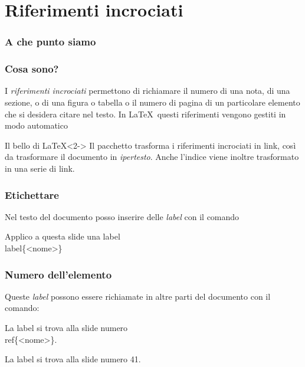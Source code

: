 \documentclass[svgnames,%
	ucs,%
	pdftex]{guitbeamer}
\begin{document}
\section{Riferimenti incrociati}
\begin{frame}
  \frametitle{A che punto siamo}
\end{frame}
\begin{frame}
  \frametitle{Cosa sono?}
	I \emph{riferimenti incrociati} permettono di richiamare il numero di
	una nota, di una sezione, o di una figura o tabella o il numero di
	pagina di un particolare elemento che si desidera citare nel testo.
  \bigskip
	In \LaTeX\ questi riferimenti vengono gestiti in modo automatico	
	\begin{block}{Il bello di \LaTeX}<2->
		Il pacchetto  trasforma i riferimenti incrociati in
		link, cos\`i da trasformare il documento in \emph{ipertesto}. Anche
		l'indice viene inoltre trasformato in una serie di link.
	\end{block}
\end{frame}
\begin{frame}\label{nome}
  \frametitle{Etichettare}
	Nel testo del documento posso inserire delle \textit{label} con il
	comando
	\begin{LaTeXcode}
		Applico a questa slide una label \alert{\\label\{<nome>\}} 
	\end{LaTeXcode}
\end{frame}
\begin{frame}
  \frametitle{Numero dell'elemento}
	Queste \textit{label} possono essere richiamate in altre parti del
	documento con il comando:
	\begin{LaTeXcode}
		La label si trova alla slide numero \alert{\\ref\{<nome>\}}.
	\end{LaTeXcode}
	\begin{LaTeXoutput}
		La label si trova alla slide numero 41. %
	\end{LaTeXoutput}
\end{frame}
\end{document}
